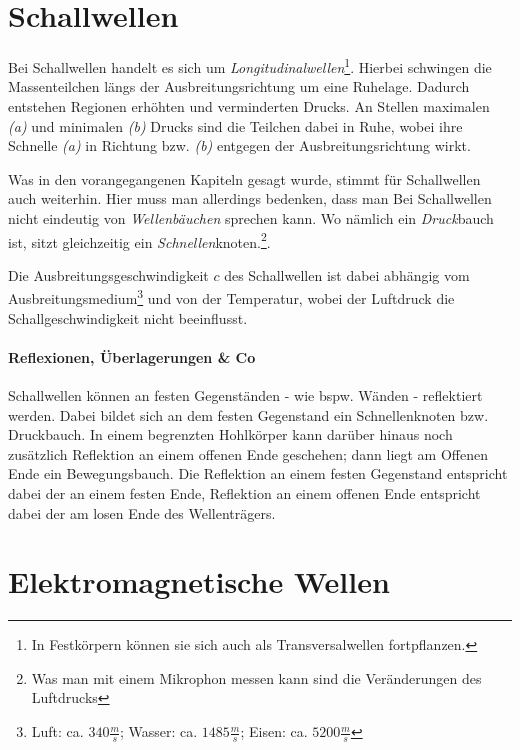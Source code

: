 		\chapter{Schallwellen}

Bei Schallwellen handelt es sich um \emph{Longitudinalwellen}\footnote{In Festkörpern können sie sich auch als Transversalwellen fortpflanzen.}. Hierbei schwingen die Massenteilchen längs der Ausbreitungsrichtung um eine Ruhelage. Dadurch entstehen Regionen erhöhten und verminderten Drucks. An Stellen maximalen \textit{(a)} und minimalen \textit{(b)} Drucks sind die Teilchen dabei in Ruhe, wobei ihre Schnelle \textit{(a)} in Richtung bzw. \textit{(b)} entgegen der Ausbreitungsrichtung wirkt.

Was in den vorangegangenen Kapiteln gesagt wurde, stimmt für Schallwellen auch weiterhin. Hier muss man allerdings bedenken, dass man Bei Schallwellen nicht eindeutig von \emph{Wellenbäuchen} sprechen kann. Wo nämlich ein \emph{Druck}bauch ist, sitzt gleichzeitig ein \emph{Schnellen}knoten.\footnote{Was man mit einem Mikrophon messen kann sind die Veränderungen des Luftdrucks}.

Die Ausbreitungsgeschwindigkeit \(c\) des Schallwellen ist dabei abhängig vom Ausbreitungsmedium\footnote{Luft: ca. \(340 \frac{m}{s}\); Wasser: ca. \(1485 \frac{m}{s}\); Eisen: ca. \(5200 \frac{m}{s}\)} und von der Temperatur, wobei der Luftdruck die Schallgeschwindigkeit nicht beeinflusst.


\subsubsection{Reflexionen, Überlagerungen \& Co}

Schallwellen können an festen Gegenständen - wie bspw. Wänden - reflektiert werden. Dabei bildet sich an dem festen Gegenstand ein Schnellenknoten bzw. Druckbauch. In einem begrenzten Hohlkörper kann darüber hinaus noch zusätzlich Reflektion an einem offenen Ende geschehen; dann liegt am Offenen Ende ein Bewegungsbauch. Die Reflektion an einem festen Gegenstand entspricht dabei der an einem festen Ende, Reflektion an einem offenen Ende entspricht dabei der am losen Ende des Wellenträgers.









		\chapter{Elektromagnetische Wellen}


